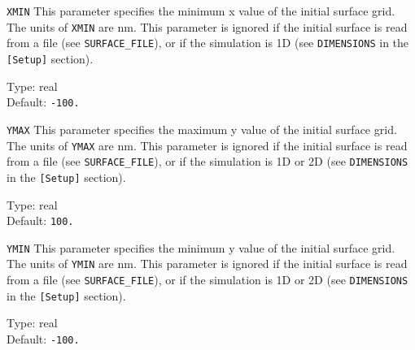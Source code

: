 \begin{keydescription}{\texttt{XMIN}}
This parameter specifies the minimum x value of the initial surface grid. The
units of \texttt{XMIN} are nm. This parameter is ignored if the initial surface
is read from a file (see \texttt{SURFACE\_FILE}), or if the simulation is 1D
(see \texttt{DIMENSIONS} in the \texttt{[Setup]} section).
\begin{keytab}
   Type:    \> real \\
   Default: \> \texttt{-100.}
\end{keytab}
\end{keydescription}

\begin{keydescription}{\texttt{YMAX}}
This parameter specifies the maximum y value of the initial surface grid. The
units of \texttt{YMAX} are nm. This parameter is ignored if the initial surface
is read from a file (see \texttt{SURFACE\_FILE}), or if the simulation is 1D or
2D (see \texttt{DIMENSIONS} in the \texttt{[Setup]} section).
\begin{keytab}
   Type:    \> real \\
   Default: \> \texttt{100.}
\end{keytab}
\end{keydescription}

\begin{keydescription}{\texttt{YMIN}}
This parameter specifies the minimum y value of the initial surface grid. The
units of \texttt{YMIN} are nm. This parameter is ignored if the initial surface
is read from a file (see \texttt{SURFACE\_FILE}), or if the simulation is 1D or
2D (see \texttt{DIMENSIONS} in the \texttt{[Setup]} section).
\begin{keytab}
   Type:    \> real \\
   Default: \> \texttt{-100.}
\end{keytab}
\end{keydescription}

